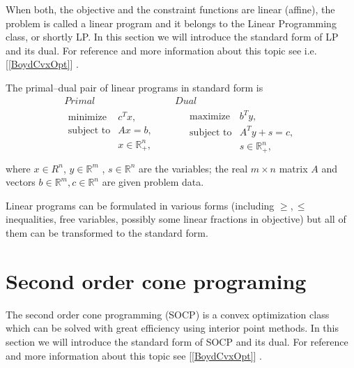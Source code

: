\documentclass[12pt]{book}
\theoremstyle{definition}
\begin{document}
When both, the objective and the constraint functions are linear (affine), the problem is called a linear program and it belongs to the Linear Programming class, or shortly LP.
In this section we will introduce the standard form of LP and its dual. For reference and more information about this topic see i.e. [\ref{BoydCvxOpt}] .

\label{defLP}
The primal--dual pair of linear programs in standard form is 
\begin{equation}
\label{LP} 
\begin{array}{cc}
Primal & Dual \\
\begin{array}{ll}
\mbox{minimize} & c^Tx, \\
\mbox{subject to}& Ax = b ,  \\
& x \in \mathbb{R}^n_+,\\

\end{array} 
\ \ \ \ \ & \ \ \ \ \ 
\begin{array}{ll}
\mbox{maximize} & b^Ty, \\
\mbox{subject to}& A^Ty +s = c ,  \\
& s\in \mathbb{R}^n_+, \\
\end{array}
\end{array} 
\end{equation}
where $x\in R^n$, $y\in \mathbb{R}^m$ , $s\in \mathbb{R}^n$ are the variables; the real $m\times n$ matrix $A$ and vectors $b \in \mathbb{R}^m, c\in \mathbb{R}^n$ are given problem data.

\bigskip

\rem Linear programs can be formulated in various forms (including $\geq , \leq$ inequalities, free variables, possibly some linear fractions in objective) but all of them can be transformed to the standard form.
%


\section{Second order cone programing}
\label{SectionSOCP}


The second order cone programming (SOCP) is a convex optimization class which can be solved with great efficiency using interior point methods. 
In this section we will introduce the standard form of SOCP and its dual. For reference and more information about this topic see [\ref{BoydCvxOpt}] .
\end{document}
